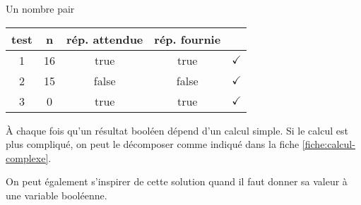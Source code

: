 \begin{Fiche}{Un nombre pair}
	\begin{center}
		\begin{tabular}{|c|ccc|c|}
		\hline
			\rowcolor{black!40}
		test \no & n & rép. attendue & rép. fournie & {} \\
		\hline 
		1 & 16   & true   & true & {\color{ForestGreen}$\checkmark$} \\\hline
		2 & 15   & false   & false & {\color{ForestGreen}$\checkmark$} \\\hline
		3 & 0   & true   & true & {\color{ForestGreen}$\checkmark$} \\\hline
		\end{tabular}
	\end{center}								

	

	À chaque fois qu’un résultat booléen dépend d’un calcul simple.
	Si le calcul est plus compliqué, on peut le décomposer comme
	indiqué dans la fiche \vref{fiche:calcul-complexe}.
	
	On peut également s’inspirer de cette solution
	quand il faut donner sa valeur à une variable booléenne.
		
\end{Fiche}
